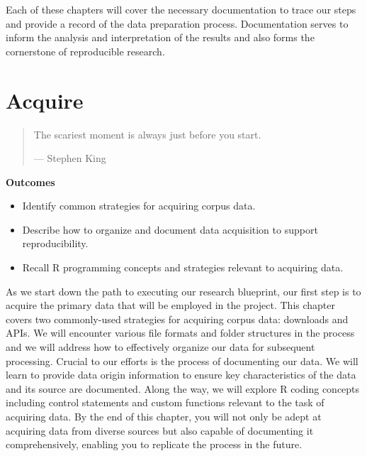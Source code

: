 \documentclass[
  letterpaper,
]{latex/krantz}
\providecommand{\tightlist}{%
  \setlength{\itemsep}{0pt}\setlength{\parskip}{0pt}}\usepackage{longtable,booktabs,array}
\theoremstyle{definition}
\theoremstyle{remark}
\begin{document}
Each of these chapters will cover the necessary documentation to trace
our steps and provide a record of the data preparation process.
Documentation serves to inform the analysis and interpretation of the
results and also forms the cornerstone of reproducible research.

\chapter{Acquire}\label{sec-acquire-chapter}

\begin{quote}
The scariest moment is always just before you start.

--- Stephen King
\end{quote}

\begin{tcolorbox}[enhanced jigsaw, colframe=quarto-callout-color-frame, breakable, bottomrule=.15mm, arc=.35mm, left=2mm, opacityback=0, rightrule=.15mm, colback=white, toprule=.15mm, leftrule=.75mm]

\textbf{ Outcomes}

\begin{itemize}
\tightlist
\item
  Identify common strategies for acquiring corpus data.
\item
  Describe how to organize and document data acquisition to support
  reproducibility.
\item
  Recall R programming concepts and strategies relevant to acquiring
  data.
\end{itemize}

\end{tcolorbox}

As we start down the path to executing our research blueprint, our first
step is to acquire the primary data that will be employed in the
project. This chapter covers two commonly-used strategies for acquiring
corpus data: downloads and APIs. We will encounter various file formats
and folder structures in the process and we will address how to
effectively organize our data for subsequent processing. Crucial to our
efforts is the process of documenting our data. We will learn to provide
data origin information to ensure key characteristics of the data and
its source are documented. Along the way, we will explore R coding
concepts including control statements and custom functions relevant to
the task of acquiring data. By the end of this chapter, you will not
only be adept at acquiring data from diverse sources but also capable of
documenting it comprehensively, enabling you to replicate the process in
the future.
\end{document}
